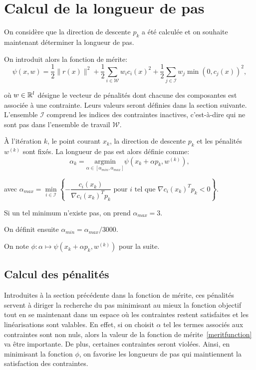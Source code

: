 \section{Calcul de la longueur de pas}\label{calcul_pas}

On considère que la direction de descente $p_{k}$ a été calculée et on souhaite maintenant déterminer la longueur de pas. 

On introduit alors la fonction de mérite: 
\begin{equation} \label{meritfunction}
\psi(x,w) = \dfrac{1}{2}\|r(x)\|^2 +  \dfrac{1}{2}\sum_{i \in \mathcal{W}} w_ic_i(x)^2 + \dfrac{1}{2} \sum_{j \in \mathcal{I}} w_j\min(0,c_j(x))^2,
\end{equation}

où $w \in \mathbb{R}^{l}$ désigne le vecteur de pénalités dont chacune des composantes est associée à une contrainte. Leurs valeurs seront définies dans la section suivante.
L'ensemble $\mathcal{I}$ comprend les indices des contraintes inactives, c'est-à-dire qui ne sont pas dans l'ensemble de travail $\mathcal{W}$.

\`A l'itération $k$, le point courant $x_{k}$, la direction de descente $p_{k}$ et les pénalités $w^{(k)}$ sont fixés. La longueur de pas est alors définie comme:
\begin{equation}
\alpha_{k} = \underset{\alpha \in [\alpha_{min},\alpha_{max}]}{\text{argmin}} \psi\left(x_{k}+\alpha p_{k},w^{(k)}\right),
\end{equation}

avec $\alpha_{max} = \underset{i \in \mathcal{I}}{\min}\left\{-\dfrac{c_i(x_{k})}{\nabla c_i(x_{k})^Tp_{k}} \text{ pour }i \text{ tel que } \nabla c_i(x_{k})^Tp_{k} < 0 \right\}$. 

Si un tel minimum n'existe pas, on prend $\alpha_{max} = 3$. 

On définit ensuite $\alpha_{min}=\alpha_{max} / 3000$.

On note $\phi: \alpha \mapsto \psi(x_{k}+\alpha p_{k},w^{(k)})$ pour la suite.

\subsection*{Calcul des pénalités} \label{calcul poids}

Introduites à la section précédente dans la fonction de mérite, ces pénalités servent à diriger la recherche du pas minimisant au mieux la fonction objectif 
tout en se maintenant dans un espace où les contraintes restent satisfaites et les linéarisations sont valables. 
En effet, si on choisit $\alpha$ tel les termes associés aux contraintes sont non nuls, alors la valeur de la fonction de mérite~\eqref{meritfunction} va 
être importante. De plus, certaines contraintes seront violées.
Ainsi, en minimisant la fonction $\phi$, on favorise les longueurs de pas qui maintiennent la satisfaction des contraintes.

